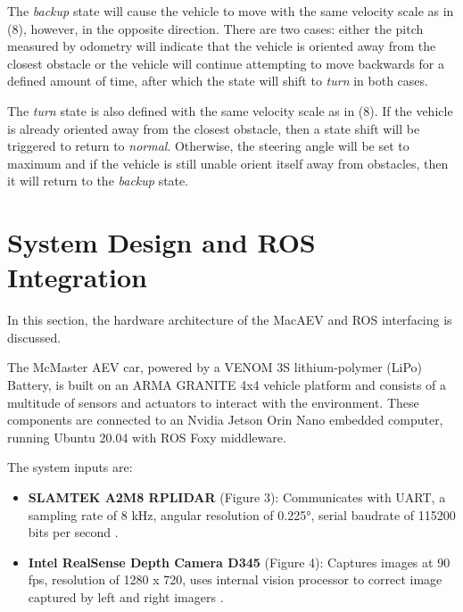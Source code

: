 \documentclass[conference]{IEEEtran}
\begin{document}
The \textit{backup} state will cause the vehicle to move with the same velocity scale as in (8), however, in the opposite direction. There are two cases: either the pitch measured by odometry will indicate that the vehicle is oriented away from the closest obstacle or the vehicle will continue attempting to move backwards for a defined amount of time, after which the state will shift to \textit{turn} in both cases.

The \textit{turn} state is also defined with the same velocity scale as in (8). If the vehicle is already oriented away from the closest obstacle, then a state shift will be triggered to return to \textit{normal}. Otherwise, the steering angle will be set to maximum and if the vehicle is still unable orient itself away from obstacles, then it will return to the \textit{backup} state.

\section{System Design and ROS Integration}





In this section, the hardware architecture of the MacAEV and ROS interfacing is discussed.  

The McMaster AEV car, powered by a VENOM 3S lithium-polymer (LiPo) Battery, is built on an ARMA GRANITE 4x4 vehicle platform and consists of a multitude of sensors and actuators to interact with the environment. These components are connected to an Nvidia Jetson Orin Nano embedded computer, running Ubuntu 20.04 with ROS Foxy middleware.

The system inputs are:
\begin{itemize}
    \item \textbf{SLAMTEK A2M8 RPLIDAR} (Figure 3): Communicates with UART, a sampling rate of 8 kHz, angular resolution of \ang{0.225}, serial baudrate of 115200 bits per second \cite{b6}.
    \item \textbf{Intel RealSense Depth Camera D345} (Figure 4): Captures images at 90 fps, resolution of 1280 x 720, uses internal vision processor to correct image captured by left and right imagers \cite{b7}.
\end{itemize}
\end{document}
